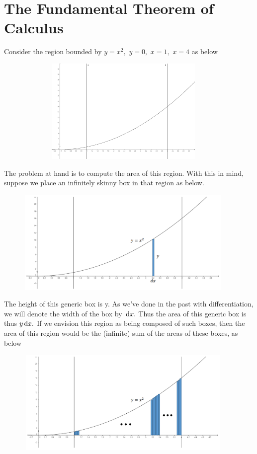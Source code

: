 \chapter{The Fundamental Theorem of Calculus }
  \label{chapt:FTC}
\aptta{}
\endaptta{}
Consider the region bounded by $y=x^2,$ $y=0,$ $x=1,$ $x=4$ as below\\
\centerline{\includegraphics*[height=2in,width=5in]{Figures/FTC-1}}
The problem at hand is to compute the area of this region.  With this
in mind, suppose we place an infinitely skinny box in that region as
below.\\ 
\centerline{\includegraphics*[height=2in,width=5in]{Figures/FTC-2}}
The height of this generic box is y.  As we've done in the past with
differentiation, we will denote the width of the box by $\thinspace{\rm d}x.$  Thus the
area of this generic box is thus $y\thinspace{\rm d}x.$  If we envision this region as
being composed of such boxes, then the area of this region would be
the (infinite) sum of the areas of these boxes, as below\\
\centerline{\includegraphics*[height=2in,width=5in]{Figures/FTC-3}}

